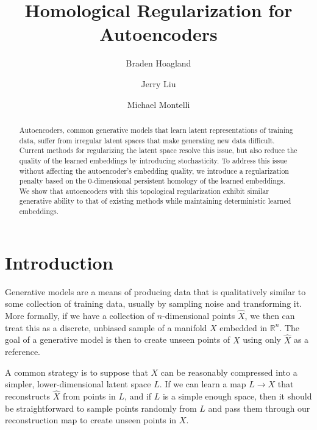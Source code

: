 \documentclass[conference]{IEEEtran}
\newcommand{\R}{\mathbb{R}}
\begin{document}
\title{Homological Regularization for Autoencoders}
\author{Braden Hoagland \and Jerry Liu \and Michael Montelli}
\maketitle

\begin{abstract}
	Autoencoders, common generative models that learn latent representations of training data, suffer from irregular latent spaces that make generating new data difficult. Current methods for regularizing the latent space resolve this issue, but also reduce the quality of the learned embeddings by introducing stochasticity. To address this issue without affecting the autoencoder's embedding quality, we introduce a regularization penalty based on the 0-dimensional persistent homology of the learned embeddings. We show that autoencoders with this topological regularization exhibit similar generative ability to that of existing methods while maintaining deterministic learned embeddings.
\end{abstract}

\section{Introduction}

Generative models are a means of producing data that is qualitatively similar to some collection of training data, usually by sampling noise and transforming it. More formally, if we have a collection of $n$-dimensional points $\hat{X}$, we then can treat this as a discrete, unbiased sample of a manifold $X$ embedded in $\R^{n}$. The goal of a generative model is then to create unseen points of $X$ using only $\hat{X}$ as a reference.

A common strategy is to suppose that $X$ can be reasonably compressed into a simpler, lower-dimensional latent space $L$. If we can learn a map $L\to X$ that reconstructs $\hat{X}$ from points in $L$, and if $L$ is a simple enough space, then it should be straightforward to sample points randomly from $L$ and pass them through our reconstruction map to create unseen points in $X$.
\end{document}

